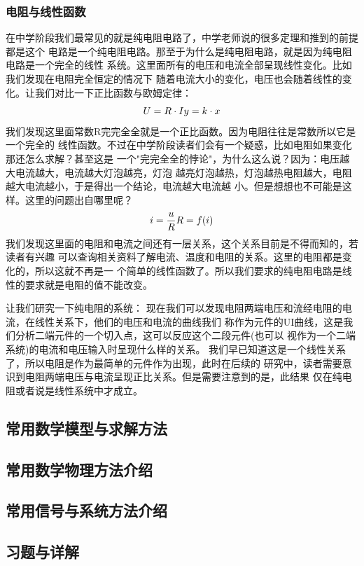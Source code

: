     \subsubsection{电阻与线性函数}
    在中学阶段我们最常见的就是纯电阻电路了，中学老师说的很多定理和推到的前提都是这个
    电路是一个纯电阻电路。那至于为什么是纯电阻电路，就是因为纯电阻电路是一个完全的线性
    系统。这里面所有的电压和电流全部呈现线性变化。比如我们发现在电阻完全恒定的情况下
    随着电流大小的变化，电压也会随着线性的变化。让我们对比一下正比函数与欧姆定律：
    $$
    U = R \cdot I   \\
    y = k \cdot x
    $$
    我们发现这里面常数R完完全全就是一个正比函数。因为电阻往往是常数所以它是一个完全的
    线性函数。不过在中学阶段读者们会有一个疑惑，比如电阻如果变化那还怎么求解？甚至这是
    一个"完完全全的悖论"，为什么这么说？因为：电压越大电流越大，电流越大灯泡越亮，灯泡
    越亮灯泡越热，灯泡越热电阻越大，电阻越大电流越小，于是得出一个结论，电流越大电流越
    小。但是想想也不可能是这样。这里的问题出自哪里呢？
    $$
        i = \frac{u}{R} \\
        R = f(i)
    $$
    我们发现这里面的电阻和电流之间还有一层关系，这个关系目前是不得而知的，若读者有兴趣
    可以查询相关资料了解电流、温度和电阻的关系。这里的电阻都是变化的，所以这就不再是一
    个简单的线性函数了。所以我们要求的纯电阻电路是线性的要求就是电阻的值不能改变。

    让我们研究一下纯电阻的系统：
    \figResistanceUIAnalysis
    现在我们可以发现电阻两端电压和流经电阻的电流，在线性关系下，他们的电压和电流的曲线我们
    称作为元件的UI曲线，这是我们分析二端元件的一个切入点，这可以反应这个二段元件(也可以
    视作为一个二端系统)的电流和电压输入时呈现什么样的关系。
    \figResistanceUIAnalysisFancImage
    我们早已知道这是一个线性关系了，所以电阻是作为最简单的元件作为出现，此时在后续的
    研究中，读者需要意识到电阻两端电压与电流呈现正比关系。但是需要注意到的是，此结果
    仅在纯电阻或者说是线性系统中才成立。







    \newpage
    \subsection{常用数学模型与求解方法}

    \newpage
    \subsection{常用数学物理方法介绍}

    \newpage
    \subsection{常用信号与系统方法介绍}

    \newpage
    \subsection{习题与详解}